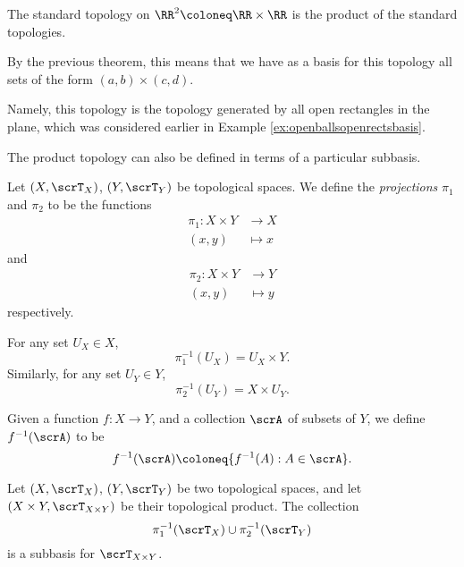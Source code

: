\documentclass{article}
\begin{document}
\begin{example}
    The standard topology on $\RR^2 \coloneq \RR \times \RR$ is the product of the standard topologies.

    By the previous theorem, this means that we have as a basis for this topology all sets of the form $(a,b) \times (c,d)$.

    Namely, this topology is the topology generated by all open rectangles in the plane, which was considered earlier in Example \ref{ex:openballsopenrectsbasis}.
\end{example}

The product topology can also be defined in terms of a particular subbasis.

\begin{definition}
    Let $(X, \scrT_X)$, $(Y, \scrT_Y)$ be topological spaces.
    We define the \textit{projections} $\pi_1$ and $\pi_2$ to be the functions
    \begin{align*}
        \pi_1: X \times Y &\to X \\
        (x,y) &\mapsto x
    \end{align*}
and
    \begin{align*}
        \pi_2: X \times Y &\to Y \\
        (x,y) &\mapsto y
    \end{align*}
respectively.
\end{definition}

\begin{remark}
    For any set $U_X \in X$,
    \[
        \pi_1^{-1}(U_X) = U_X \times Y.
    \]
    Similarly, for any set $U_Y \in Y$,
    \[
        \pi_2^{-1}(U_Y) = X \times U_Y.
    \]
\end{remark}

\begin{convention}
    Given a function $f: X \to Y$, and a collection $\scrA$ of subsets of $Y$, we define $f^{-1}(\scrA)$ to be
    \[
        f^{-1}(\scrA) \coloneq \{f^{-1}(A): A \in \scrA\}.
    \]
\end{convention}

\begin{theorem}
    Let $(X, \scrT_X)$, $(Y, \scrT_Y)$ be two topological spaces, and let $(X \times Y, \scrT_{X \times Y})$ be their topological product.
    The collection
    \[
        \pi_1^{-1}(\scrT_X)
        \cup
        \pi_2^{-1}(\scrT_Y)
    \]
    is a subbasis for $\scrT_{X \times Y}$.
\end{theorem}
\end{document}
